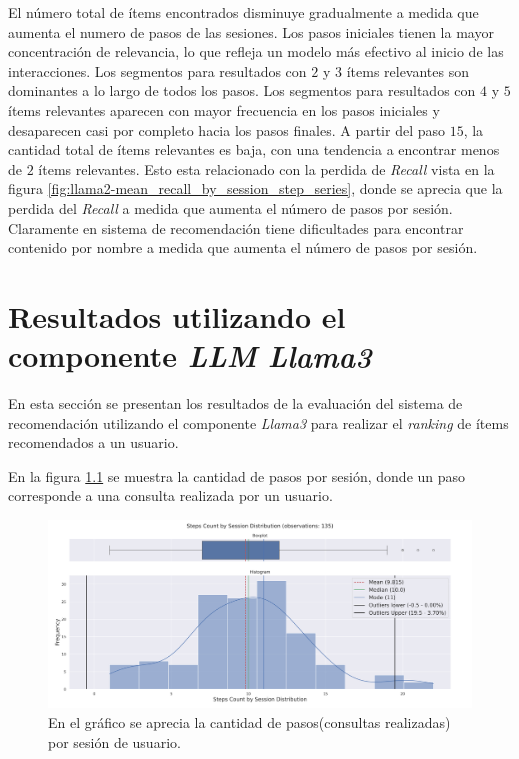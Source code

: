 \documentclass[11pt,a4paper,twoside]{thesis}
\begin{document}
El número total de ítems encontrados disminuye gradualmente a medida que aumenta el numero de pasos de las sesiones. Los pasos iniciales tienen la mayor concentración de relevancia, lo que refleja un modelo más efectivo al inicio de las interacciones. Los segmentos para resultados con $2$ y $3$ ítems relevantes son dominantes a lo largo de todos los pasos.
Los segmentos para resultados con $4$ y $5$ ítems relevantes aparecen con mayor frecuencia en los pasos iniciales y desaparecen casi por completo hacia los pasos finales. A partir del paso $15$, la cantidad total de ítems relevantes es baja, con una tendencia a encontrar menos de $2$ ítems relevantes. Esto esta relacionado con la perdida de \textit{Recall} vista en la figura \ref{fig:llama2-mean_recall_by_session_step_series}, donde se aprecia que la perdida del \textit{Recall} a medida que aumenta el número de pasos por sesión. Claramente en sistema de recomendación tiene dificultades para encontrar contenido por nombre a medida que aumenta el número de pasos por sesión.

\chapter{Resultados utilizando el componente \textit{LLM} \textit{Llama3}}

En esta sección se presentan los resultados de la evaluación del sistema de recomendación utilizando el componente \textit{Llama3} para realizar el \textit{ranking} de ítems recomendados a un usuario.

En la figura \ref{fig:llama3-steps_count_by_session_distribution} se muestra la cantidad de pasos por sesión, donde un paso corresponde a una consulta realizada por un usuario.

\begin{figure}[H]
	\centering
	\includegraphics[width=15cm]{./images/llama3/steps_count_by_session_distribution.png}
	\caption{En el gráfico se aprecia la cantidad de pasos(consultas realizadas) por sesión de usuario.}
	\label{fig:llama3-steps_count_by_session_distribution}
\end{figure}
\end{document}

